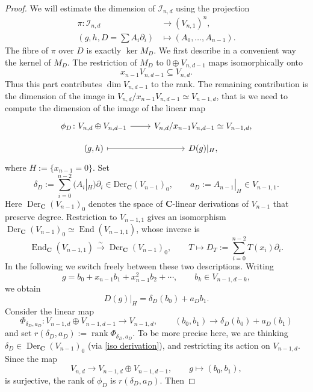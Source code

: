 \documentclass[10pt,a4paper]{amsart}
\providecommand{\CC}{\mathbf{C}}
\DeclareMathOperator{\rank}{rank}
\numberwithin{equation}{section}
\theoremstyle{plain}
\theoremstyle{definition}
\theoremstyle{plain}
\theoremstyle{definition}
\begin{document}
\begin{proof}
We will estimate the dimension of \(\mathcal I_{n,d}\) using the projection
\[
\begin{aligned}
\pi\colon\mathcal I_{n,d}&\longrightarrow(V_{n,1})^n,\\
(g,h,D=\textstyle\sum A_i\partial_i)&\longmapsto(A_0,\dots,A_{n-1}).
\end{aligned}
\]
The fibre of \(\pi\) over \(D\) is exactly \(\ker M_D\). We first describe in a convenient way the kernel of $M_D$. The restriction of \(M_D\) to \(0\oplus V_{n,d-1}\) maps isomorphically
onto
\[
x_{n-1}V_{n,d-1}\subseteq V_{n,d}.
\]
Thus this part contributes \(\dim V_{n,d-1}\) to the rank. The remaining
contribution is the dimension of the image in $V_{n,d}/x_{n-1}V_{n,d-1} \simeq V_{n-1,d}$, that is we need to compute the dimension of the image of the linear map
\[
\begin{tikzcd}[row sep=small]
\phi_D\colon V_{n,d}\oplus V_{n,d-1}
  \arrow[r]
&V_{n,d}/x_{n-1}V_{n,d-1}\simeq V_{n-1,d},\\
(g,h)\arrow[r,mapsto]
&D(g)|_H,
\end{tikzcd}
\]
where $H:=\{x_{n-1}=0\}$.
 Set
\[
\delta_D:=
\sum_{i=0}^{n-2}(A_i|_H)\partial_i
\in \operatorname{Der_{\CC}{}}(V_{n-1})_0,
\qquad
a_D:=A_{n-1}|_H\in V_{n-1,1}.
\]
Here $\operatorname{Der}_{\CC}(V_{n-1})_0$ denotes the space of $\CC$-linear derivations of $V_{n-1}$ that preserve degree. Restriction to $V_{n-1,1}$ gives an isomorphism $\operatorname{Der}_{\CC}(V_{n-1})_0\simeq\operatorname{End}(V_{n-1,1})$, whose inverse is
\begin{equation}
\label{iso derivation}
\operatorname{End}_{\CC}(V_{n-1,1})
\xrightarrow{\sim}
\operatorname{Der}_{\CC}(V_{n-1})_0,
\qquad
T\longmapsto
D_T:=\sum_{i=0}^{n-2}T(x_i)\partial_i.
\end{equation}
In the following we switch freely between these two descriptions. Writing
\[
g=b_0+x_{n-1}b_1+x_{n-1}^2b_2+\cdots,
\qquad
b_k\in V_{n-1,d-k},
\]
we obtain
\[
D(g)|_H=\delta_D(b_0)+a_Db_1.
\]
Consider the linear map
\[
\Phi_{\delta_D,a_D}\colon V_{n-1,d} \oplus V_{n-1,d-1}  \rightarrow V_{n-1,d}, \quad  \quad (b_0,b_1) \rightarrow \delta_D(b_0) 
 +a_D(b_1)
\]
and set $r(\delta_D,a_D):=\rank\Phi_{\delta_D,a_D}$. To be more precise here, we are thinking $\delta_D \in \operatorname{Der}_{\CC}(V_{n-1})_0$ (via \eqref{iso derivation}), and restricting its action on $V_{n-1,d}$. Since the map
\[
V_{n,d}\longrightarrow V_{n-1,d}\oplus V_{n-1,d-1},
\qquad
g\longmapsto(b_0,b_1),
\]
is surjective, the rank of $\phi_D$ is \(r(\delta_D,a_D)\). Then

\end{proof}
\end{document}
